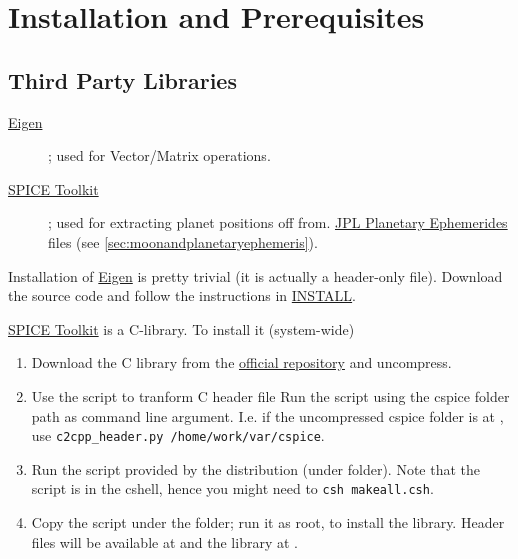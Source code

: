 \section{Installation and Prerequisites}\label{sec:installation-and-prerequisites}

\subsection{Third Party Libraries}
\begin{description}
  \item [\href{https://eigen.tuxfamily.org/index.php?title=Main_Page}{Eigen}]; 
  used for Vector/Matrix operations.
  \item [\href{https://naif.jpl.nasa.gov/naif/toolkit.html}{SPICE Toolkit}]; 
  used for extracting planet positions off from. 
  \href{https://ssd.jpl.nasa.gov/planets/eph_export.html}{JPL Planetary Ephemerides} files 
  (see \autoref{sec:moonandplanetaryephemeris}).
\end{description}

Installation of \href{https://eigen.tuxfamily.org/index.php?title=Main_Page}{Eigen} is 
pretty trivial (it is actually a header-only file). Download the source code and follow 
the instructions in \href{https://gitlab.com/libeigen/eigen/-/blob/master/INSTALL?ref_type=heads}{INSTALL}.

\href{https://naif.jpl.nasa.gov/naif/toolkit.html}{SPICE Toolkit} is a C-library. 
To install it (system-wide)
\begin{enumerate}
  \item Download the C library from the \href{https://naif.jpl.nasa.gov/naif/toolkit_C.html}{official repository} 
    and uncompress.
  \item Use the script  to tranform 
    C header file Run the script using the cspice  folder path 
    as command line argument. I.e. if the uncompressed cspice folder is at , 
    use \texttt{c2cpp\_header.py /home/work/var/cspice}.
  \item Run the  script provided by the distribution (under 
     folder). Note that the script is in the cshell, hence you 
    might need to \texttt{csh makeall.csh}.
  \item Copy the  script under the  
    folder; run it as root, to install the library. Header files will be available at 
     and the library at .
\end{enumerate}
